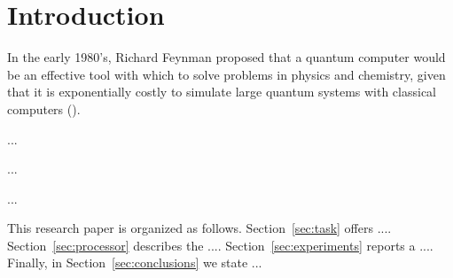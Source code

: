 \section{Introduction}
\label{sec:introduction}
%
%
In the early 1980's, Richard Feynman proposed that a quantum computer would be
an effective tool with which to solve problems in physics and chemistry, given
that it is exponentially costly to simulate large quantum systems with
classical computers (\cite{feynman1982simulating}).

...

...

...

%
%
This research paper is organized as follows. Section~\ref{sec:task} offers
.... Section~\ref{sec:processor} describes the .... Section~\ref{sec:experiments}
reports a .... Finally, in Section~\ref{sec:conclusions} we state ...
